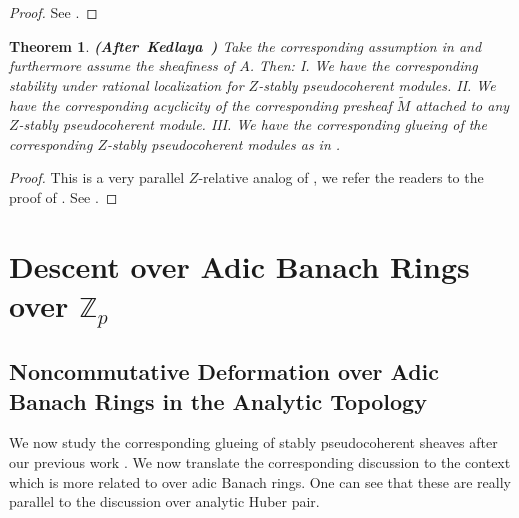 \documentclass[12pt]{amsart}
\newtheorem{theorem}{Theorem}[section]
\theoremstyle{definition}
\numberwithin{equation}{section}
\begin{document}
\begin{proof}
See \cite[Corollary 1.9.18]{Ked2}.	
\end{proof}




\begin{theorem} \mbox{\bf{(After Kedlaya \cite[Theorem 1.4.14, Theorem 1.4.16, Theorem 1.4.18]{Ked2})}}
Take the corresponding assumption in \cite[1.7.1]{Ked2} and furthermore assume the sheafiness of $A$. Then: I. We have the corresponding stability under rational localization for $Z$-stably pseudocoherent modules. II. We have the corresponding acyclicity of the corresponding presheaf $\widetilde{M}$ attached to any $Z$-stably pseudocoherent module. III. We have the corresponding glueing of the corresponding $Z$-stably pseudocoherent modules as in \cite[Theorem 1.4.18]{Ked2}.
\end{theorem}


\begin{proof}
This is a very parallel $Z$-relative analog of \cite[Theorem 1.4.14, Theorem 1.4.16, Theorem 1.4.18]{Ked2}, we refer the readers to the proof of \cite[Theorem 1.4.14, Theorem 1.4.16, Theorem 1.4.18]{Ked2}. See \cite[After Corollary 1.9.18, the proof of Theorem 1.4.14, the proof of Theorem 1.4.16, the proof of Theorem 1.4.18]{Ked2}.	
\end{proof}









\newpage

\section{Descent over Adic Banach Rings over $\mathbb{Z}_p$}

\subsection{Noncommutative Deformation over Adic Banach Rings in the Analytic Topology}



\noindent We now study the corresponding glueing of stably pseudocoherent sheaves after our previous work \cite{TX3}. We now translate the corresponding discussion to the context which is more related to \cite{KL2} over adic Banach rings. One can see that these are really parallel to the discussion over analytic Huber pair.
\end{document}
